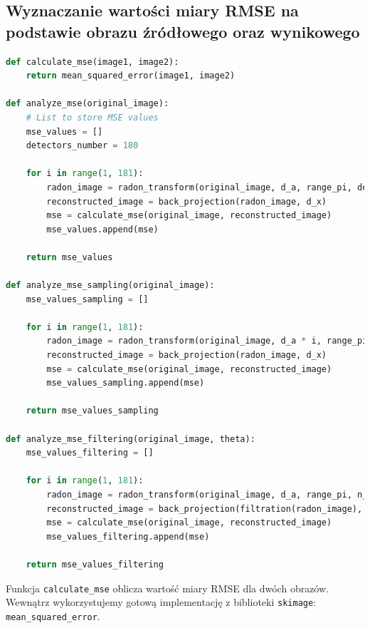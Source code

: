 \documentclass[11pt,a4paper]{article}
\begin{document}
    \subsection{Wyznaczanie wartości miary RMSE na podstawie obrazu źródłowego oraz wynikowego}\label{sec:wyznaczanie-wartosci-miary-rmse-na-podstawie-obrazu-zrodowego-oraz-wynikowego}
    \begin{lstlisting}[language=Python, basicstyle=\normal, breaklines=true]
def calculate_mse(image1, image2):
    return mean_squared_error(image1, image2)

def analyze_mse(original_image):
    # List to store MSE values
    mse_values = []
    detectors_number = 180

    for i in range(1, 181):
        radon_image = radon_transform(original_image, d_a, range_pi, detectors_number, d_x)
        reconstructed_image = back_projection(radon_image, d_x)
        mse = calculate_mse(original_image, reconstructed_image)
        mse_values.append(mse)

    return mse_values

def analyze_mse_sampling(original_image):
    mse_values_sampling = []

    for i in range(1, 181):
        radon_image = radon_transform(original_image, d_a * i, range_pi * i, n_detect * i, d_x)
        reconstructed_image = back_projection(radon_image, d_x)
        mse = calculate_mse(original_image, reconstructed_image)
        mse_values_sampling.append(mse)

    return mse_values_sampling

def analyze_mse_filtering(original_image, theta):
    mse_values_filtering = []

    for i in range(1, 181):
        radon_image = radon_transform(original_image, d_a, range_pi, n_detect, d_x)
        reconstructed_image = back_projection(filtration(radon_image), d_x)
        mse = calculate_mse(original_image, reconstructed_image)
        mse_values_filtering.append(mse)

    return mse_values_filtering
\end{lstlisting}
    Funkcja \texttt{calculate\_mse} oblicza wartość miary RMSE dla dwóch obrazów.
    Wewnątrz wykorzystujemy gotową implementację z biblioteki \texttt{skimage}: \texttt{mean\_squared\_error}.
\end{document}
